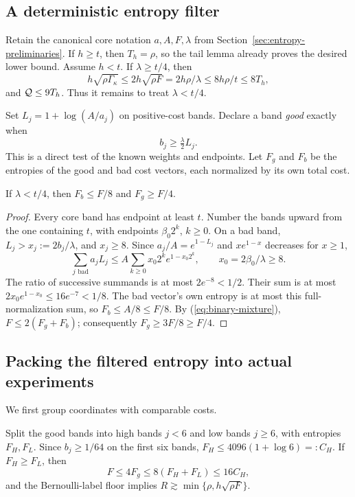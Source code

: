 \subsection{A deterministic entropy filter}
Retain the canonical core notation $a,A,F,\lambda$ from
Section~\ref{sec:entropy-preliminaries}.
If $h\ge t$, then $T_h=\rho$, so the tail lemma already proves the
desired lower bound. Assume $h<t$. If $\lambda\ge t/4$, then
\[
 h\sqrt{\rho\Gamma_\kappa}\le2h\sqrt{\rho F}
 =2h\rho/\lambda\le8h\rho/t\le8T_h,
\]
and $\mathcal Q\le9T_h$. Thus it remains to treat $\lambda<t/4$.

Set $L_j=1+\log(A/a_j)$ on positive-cost bands. Declare a band
\emph{good} exactly when
\begin{equation}\label{eq:good-band}
                       b_j\ge\tfrac\lambda2 L_j.
\end{equation}
This is a direct test of the known weights and endpoints.
Let $F_g$ and $F_b$ be the entropies of the good and bad cost vectors,
each normalized by its own total cost.

\begin{lemma}\label{lem:filter}
If $\lambda<t/4$, then $F_b\le F/8$ and $F_g\ge F/4$.
\end{lemma}
\begin{proof}
Every core band has endpoint at least $t$. Number the bands upward
from the one containing $t$, with endpoints $\beta_0 2^k$, $k\ge0$.
On a bad band, $L_j>x_j:=2b_j/\lambda$, and $x_j\ge8$.
Since $a_j/A=e^{1-L_j}$ and $xe^{1-x}$ decreases for $x\ge1$,
\[
 \sum_{j\text{ bad}}a_jL_j
 \le A\sum_{k\ge0}x_0 2^k e^{1-x_0 2^k},\qquad x_0=2\beta_0/\lambda\ge8.
\]
The ratio of successive summands is at most $2e^{-8}<1/2$.
Their sum is at most $2x_0e^{1-x_0}\le16e^{-7}<1/8$.
The bad vector's own entropy is at most this full-normalization sum,
so $F_b\le A/8\le F/8$. By (\ref{eq:binary-mixture}),
$F\le2(F_g+F_b)$; consequently $F_g\ge3F/8\ge F/4$.
\end{proof}

\subsection{Packing the filtered entropy into actual experiments}
We first group coordinates with comparable costs.


Split the good bands into high bands $j<6$ and low bands $j\ge6$,
with entropies $F_H,F_L$. Since $b_j\ge1/64$ on the first six bands,
$F_H\le4096(1+\log6)=:C_H$.
If $F_H\ge F_L$, then
\[
 F\le4F_g\le8(F_H+F_L)\le16C_H,
\]
and the Bernoulli-label floor implies
$R\gtrsim\min\{\rho,h\sqrt{\rho F}\}$.

